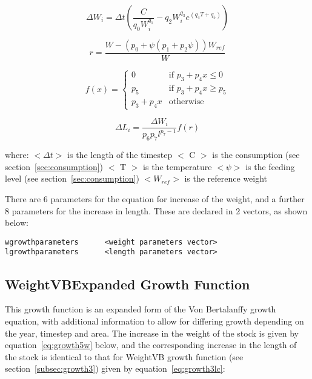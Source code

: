 \documentclass[10pt,twoside]{book}
\begin{document}
\begin{equation}\label{eq:growth4w}
\Delta W_{i} = \Delta t \left( \frac{C}{q_{0} W_{i}^{q_{1}}} - q_{2} W_{i}^{q_{3}} e^{(q_{4} T + q_{5})} \right)
\end{equation}

\begin{equation}\label{eq:growth4la}
r = \frac{W - \left( p_{0} + \psi \left( p_{1} + p_{2}\psi \right) \right) W_{ref}}{W}
\end{equation}

\begin{equation}\label{eq:growth4lb}
f(x) =
\begin{cases}
0 & \textrm{if $p_{3} + p_{4}x \leq 0$} \\
p_{5} & \textrm{if $p_{3} + p_{4}x \geq p_{5}$} \\
p_{3} + p_{4}x & \textrm{otherwise}
\end{cases}
\end{equation}

\begin{equation}\label{eq:growth4lc}
\Delta L_{i} = \frac{\Delta W_{i}} {p_{6} p_{7} l^{p_{7} - 1}} f(r)
\end{equation}

where:\newline
$<\Delta t>$ is the length of the timestep\newline
$<$ C $>$ is the consumption (see section~\ref{sec:consumption})\newline
$<$ T $>$ is the temperature\newline
$<\psi>$ is the feeding level (see section~\ref{sec:consumption})\newline
$<W_{ref}>$ is the reference weight

\bigskip
There are 6 parameters for the equation for increase of the weight, and a further 8 parameters for the increase in length.  These are declared in 2 vectors, as shown below:

{\small\begin{verbatim}
wgrowthparameters      <weight parameters vector>
lgrowthparameters      <length parameters vector>
\end{verbatim}}

\subsection{WeightVBExpanded Growth Function}\label{subsec:growth5}
This growth function is an expanded form of the Von Bertalanffy growth equation, with additional information to allow for differing growth depending on the year, timestep and area.  The increase in the weight of the stock is given by equation~\ref{eq:growth5w} below, and the corresponding increase in the length of the stock is identical to that for WeightVB growth function (see section~\ref{subsec:growth3}) given by equation~\ref{eq:growth3lc}:
\end{document}
